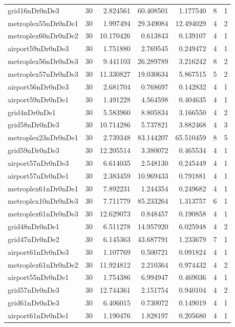 \begin{longtable}{|l|r|r|r|r|r|r|}
grid16nDr0nDe3 & 30 & 2.824561 & 60.408501 & 1.177540 & 8 & 1 \\
metroplex55nDr0nDe1 & 30 & 1.997494 & 29.349084 & 12.494029 & 4 & 2 \\
metroplex60nDr0nDe2 & 30 & 10.170426 & 0.613843 & 0.139107 & 4 & 1 \\
airport59nDr0nDe3 & 30 & 1.751880 & 2.769545 & 0.249472 & 4 & 1 \\
metroplex56nDr0nDe3 & 30 & 9.441103 & 26.289789 & 3.216242 & 8 & 2 \\
metroplex57nDr0nDe3 & 30 & 11.330827 & 19.030634 & 5.867515 & 5 & 2 \\
airport56nDr0nDe3 & 30 & 2.681704 & 0.768697 & 0.142832 & 4 & 1 \\
airport59nDr0nDe1 & 30 & 1.491228 & 4.564598 & 0.404635 & 4 & 1 \\
grid4nDr0nDe1 & 30 & 5.583960 & 8.805834 & 3.166550 & 4 & 2 \\
grid58nDr0nDe3 & 30 & 10.714286 & 5.737821 & 3.882468 & 4 & 3 \\
metroplex23nDr0nDe1 & 30 & 2.739348 & 83.144207 & 65.510459 & 8 & 5 \\
grid59nDr0nDe3 & 30 & 12.205514 & 3.380072 & 0.465534 & 4 & 1 \\
airport57nDr0nDe3 & 30 & 6.614035 & 2.548130 & 0.245449 & 4 & 1 \\
airport57nDr0nDe1 & 30 & 2.383459 & 10.969433 & 0.791881 & 4 & 1 \\
metroplex61nDr0nDe1 & 30 & 7.892231 & 1.244354 & 0.249682 & 4 & 1 \\
metroplex10nDr0nDe3 & 30 & 7.711779 & 85.233264 & 1.313757 & 6 & 1 \\
metroplex61nDr0nDe3 & 30 & 12.629073 & 0.848457 & 0.190858 & 4 & 1 \\
grid48nDr0nDe1 & 30 & 6.511278 & 14.957920 & 6.025948 & 4 & 2 \\
grid47nDr0nDe2 & 30 & 6.145363 & 43.687791 & 1.233679 & 7 & 1 \\
airport61nDr0nDe3 & 30 & 1.107769 & 0.500721 & 0.091824 & 4 & 1 \\
metroplex61nDr0nDe2 & 30 & 11.924812 & 2.210364 & 0.974432 & 4 & 2 \\
airport55nDr0nDe1 & 30 & 1.754386 & 6.994947 & 0.469036 & 4 & 1 \\
grid57nDr0nDe3 & 30 & 12.744361 & 2.151754 & 0.940104 & 4 & 2 \\
grid61nDr0nDe3 & 30 & 6.406015 & 0.730072 & 0.149019 & 4 & 1 \\
airport61nDr0nDe1 & 30 & 1.190476 & 1.828197 & 0.205680 & 4 & 1 \\

\end{longtable}
